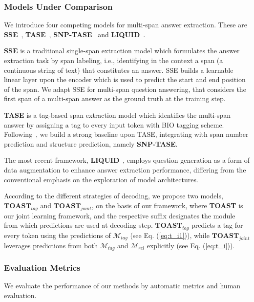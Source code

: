 \documentclass[a4paper]{cas-sc}
\newcommand{\1}[1]{\mathds{1}\left[#1\right]}
\newcommand{\eqnref}[1]{Eq. (\ref{#1})}
\begin{document}
\subsubsection{Models Under Comparison}
\label{sec:baselines}
We introduce four competing models for multi-span answer extraction. These are \textbf{SSE}~\citep{DBLP:conf/naacl/DevlinCLT19}, \textbf{TASE}~\citep{segal2020simple}, \textbf{SNP-TASE}~\citep{li2022multispanqa} and \textbf{LIQUID}~\citep{lee2023liquid}.

\textbf{SSE} is a traditional single-span extraction  model which formulates the answer extraction task by span labeling, i.e., identifying in the context a span (a continuous string of text) that constitutes an answer.  SSE builds a learnable linear layer upon the encoder which is used to predict the start and end position of the span. We adapt SSE for multi-span question answering, that considers the first span of a multi-span answer as the ground truth at the training step.

\textbf{TASE} is a tag-based span extraction model which identifies the multi-span answer by assigning a tag to every input token with BIO tagging scheme.
Following~\cite{li2022multispanqa}, we build a strong baseline upon TASE, integrating with span number prediction and structure prediction, namely \textbf{SNP-TASE}.

The most recent framework, \textbf{LIQUID}~\citep{lee2023liquid}, employs question generation as a form of data augmentation to enhance answer extraction performance, differing from the conventional emphasis on the exploration of model architectures.

According to the different strategies of decoding,
we propose two models, $\textbf{TOAST}_{tag}$ and $\textbf{TOAST}_{joint}$, on the basis of our framework, where
\textbf{TOAST} is our joint learning framework, and the respective suffix designates the module from which predictions are used at decoding step.
$\textbf{TOAST}_{tag}$ predicts a tag for every token using the predictions of $\mathcal{M}_{tag}$ (see \eqnref{eq:t_i1}), while $\textbf{TOAST}_{joint}$  leverages predictions from both $\mathcal{M}_{tag}$ and $\mathcal{M}_{rel}$ explicitly (see \eqnref{eq:t_i}).
\subsubsection{Evaluation Metrics}
\label{sec:metrics}
We evaluate the performance of our methods by automatic metrics and human evaluation.
\end{document}

